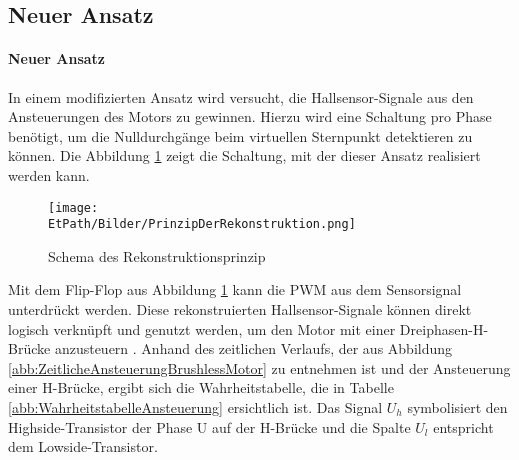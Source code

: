     \subsection{Neuer Ansatz}
\fi
\ifEMBED
    \paragraph{Neuer Ansatz}$~~$\vspace{2mm}\\
    \fi
        In einem modifizierten Ansatz wird versucht, die Hallsensor-Signale 
        aus den Ansteuerungen des Motors zu gewinnen. Hierzu wird 
        eine Schaltung pro Phase benötigt, um die Nulldurchgänge beim 
        virtuellen Sternpunkt detektieren zu können. Die Abbildung 
        \ref{abb:PrinzipRekonstruktion} zeigt die Schaltung, mit der dieser Ansatz 
        realisiert werden kann. 
    	\begin{figure}[h!]
            \centering
            \texttt{[image: \\EtPath/Bilder/PrinzipDerRekonstruktion.png]}
           	\caption{Schema des Rekonstruktionsprinzip \protect\cite{HSLU:Pluess}}
            \label{abb:PrinzipRekonstruktion}
        \end{figure}
        Mit dem Flip-Flop aus Abbildung \ref{abb:PrinzipRekonstruktion} kann die PWM aus dem 
        Sensorsignal unterdrückt werden. Diese rekonstruierten 
        Hallsensor-Signale können direkt logisch verknüpft und genutzt 
        werden, um den Motor mit einer Dreiphasen-H-Brücke anzusteuern 
        \cite{HSLU:Pluess}. Anhand des zeitlichen Verlaufs, der aus Abbildung 
        \ref{abb:ZeitlicheAnsteuerungBrushlessMotor} zu entnehmen ist und der 
        Ansteuerung einer H-Brücke, ergibt sich die Wahrheitstabelle, die in 
        Tabelle \ref{abb:WahrheitstabelleAnsteuerung} ersichtlich ist. Das 
        Signal $U_h$ symbolisiert den Highside-Transistor der Phase U auf der 
        H-Brücke und die Spalte $U_l$ entspricht dem Lowside-Transistor.\\      
